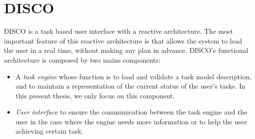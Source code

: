 	\section{DISCO}
 
 

DISCO \cite{rich2009building}is a task based user interface with a reactive architecture. The  most important feature of this reactive architecture is that allows the system to lead the user in a real time, without making any plan in advance. DISCO's functional architecture is composed by two mains components:
\begin{itemize}
	\item A \textit{task engine} whose function is to load and validate a task model description, and to maintain a representation	of the current status of the user’s tasks.\cite{rich2009building} In this present thesis, we only focus on this component. 
	\item \textit{User interface} to ensure the communication between the task engine and the user in the case where the engine needs more information or to help the user  achieving certain task.
	
	
\end{itemize}


